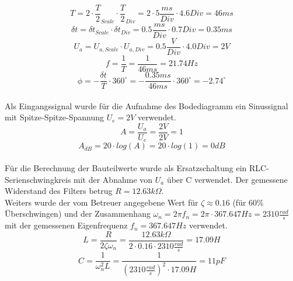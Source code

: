 \documentclass[12pt,a4paper,ngerman]{article}
\begin{document}
\begin{equation}
T = 2 \cdot \frac{T}{2}_{Scale} \cdot \frac{T}{2}_{Div} = 2 \cdot 5\frac{ms}{Div} \cdot 4.6 Div = 46ms
\end{equation}
\begin{equation}
\delta t = \delta t_{Scale} \cdot \delta t_{Div} = 0.5\frac{ms}{Div} \cdot 0.7Div = 0.35ms
\end{equation}
\begin{equation}
U_a = U_{a,Scale} \cdot U_{a,Div} = 0.5\frac{V}{Div} \cdot 4.0Div = 2V
\end{equation}
\begin{equation}
f = \frac{1}{T} = \frac{1}{46ms} = 21.74Hz
\end{equation}
\begin{equation}
\phi = - \frac{\delta t}{T} \cdot 360^\circ = -\frac{0.35ms}{46ms	} \cdot 360^\circ = -2.74^\circ
\end{equation}\\
Als Eingangssignal wurde für die Aufnahme des Bodediagramm ein Sinussignal mit Spitze-Spitze-Spannung $U_e = 2V$ verwendet.
\begin{equation}
A = \frac{U_a}{U_e} = \frac{2V}{2V} = 1
\end{equation}
\begin{equation}
A_{dB} = 20 \cdot log(A) = 20 \cdot log(1) = 0 dB
\end{equation}
\\
Für die Berechnung der Bauteilwerte wurde als Ersatzschaltung ein RLC-Serienschwingkreis mit der Abnahme von $U_a$ über C verwendet. Der gemessene Widerstand des Filters betrug $R = 12.63k\Omega$. \\
Weiters wurde der vom Betreuer angegebene Wert für $\zeta \approx 0.16$ (für 60\% Überschwingen) und der Zusammenhang $\omega_n = 2 \pi f_n = 2 \pi \cdot 367.647Hz = 2310\frac{rad}{s}$ mit der gemessenen Eigenfrequenz $f_n = 367.647Hz$ verwendet.
\begin{equation}
L = \frac{R}{2 \zeta \omega_n} = \frac{12.63k\Omega}{2 \cdot 0.16 \cdot 2310\frac{rad}{s}} = 17.09H
\end{equation}
\begin{equation}
C = \frac{1}{\omega_n^2L} = \frac{1}{(2310\frac{rad}{s})^2 \cdot 17.09H} = 11pF
\end{equation}
\end{document}
